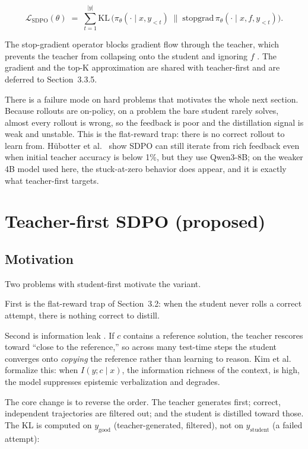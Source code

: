 \[
\mathcal{L}_{\text{SDPO}}(\theta) \;=\; \sum_{t=1}^{|y|} \mathrm{KL}\,\Big(\pi_\theta(\cdot \mid x, y_{<t}) \;\big\|\; \mathrm{stopgrad}\,\pi_\theta(\cdot \mid x, f, y_{<t})\Big).
\]

The stop-gradient operator blocks gradient flow through the teacher, which prevents the teacher from collapsing onto the student and ignoring \(f\) \cite{r1}. The gradient and the top-K approximation are shared with teacher-first and are deferred to Section~3.3.5.

There is a failure mode on hard problems that motivates the whole next section. Because rollouts are on-policy, on a problem the bare student rarely solves, almost every rollout is wrong, so the feedback is poor and the distillation signal is weak and unstable. This is the flat-reward trap: there is no correct rollout to learn from. Hübotter et al.~\cite{r1} show SDPO can still iterate from rich feedback even when initial teacher accuracy is below 1\%, but they use Qwen3-8B; on the weaker 4B model used here, the stuck-at-zero behavior does appear, and it is exactly what teacher-first targets.

\section{Teacher-first SDPO (proposed)}\label{teacher-first-sdpo-proposed}

\subsection{Motivation}\label{motivation}

Two problems with student-first motivate the variant.

First is the flat-reward trap of Section~3.2: when the student never rolls a correct attempt, there is nothing correct to distill.

Second is information leak \cite{r2}. If \(c\) contains a reference solution, the teacher rescores toward ``close to the reference,'' so across many test-time steps the student converges onto \emph{copying} the reference rather than learning to reason. Kim et al.~\cite{r2} formalize this: when \(I(y; c \mid x)\), the information richness of the context, is high, the model suppresses epistemic verbalization and degrades.

The core change is to reverse the order. The teacher generates first; correct, independent trajectories are filtered out; and the student is distilled toward those. The KL is computed on \(y_{\text{good}}\) (teacher-generated, filtered), not on \(y_{\text{student}}\) (a failed attempt):


